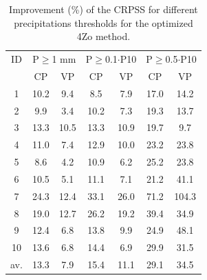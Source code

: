 \documentclass[review]{elsarticle}
\begin{document}
\begin{table}[t]
	\caption{Improvement (\%) of the CRPSS for different precipitations thresholds for the optimized 4Zo method.}
	\footnotesize
	\begin{center}
		\begin{tabular}{ccccccc}
			\hline 
			ID & \multicolumn{2}{c}{P\(\geq\)1 mm} & \multicolumn{2}{c}{P\(\geq\)0.1\(\cdot\)P10} & \multicolumn{2}{c}{P\(\geq\)0.5\(\cdot\)P10} \\ 
			& CP & VP & CP & VP & CP & VP \\ 
			\hline 
			1 & 10.2 & 9.4 & 8.5 & 7.9 & 17.0 & 14.2 \\ 
			2 & 9.9 & 3.4 & 10.2 & 7.3 & 19.3 & 13.7 \\ 
			3 & 13.3 & 10.5 & 13.3 & 10.9 & 19.7 & 9.7 \\ 
			4 & 11.0 & 7.4 & 12.9 & 10.0 & 23.2 & 23.8 \\ 
			5 & 8.6 & 4.2 & 10.9 & 6.2 & 25.2 & 23.8 \\ 
			6 & 10.5 & 5.1 & 11.1 & 7.1 & 21.2 & 41.1 \\ 
			7 & 24.3 & 12.4 & 33.1 & 26.0 & 71.2 & 104.3 \\ 
			8 & 19.0 & 12.7 & 26.2 & 19.2 & 39.4 & 34.9 \\ 
			9 & 12.4 & 6.8 & 13.8 & 9.9 & 24.9 & 48.1 \\ 
			10 & 13.6 & 6.8 & 14.4 & 6.9 & 29.9 & 31.5 \\ 
			\hline 
			av. & 13.3 & 7.9 & 15.4 & 11.1 & 29.1 & 34.5 \\ 
			\hline 
		\end{tabular} 
	\end{center}
	\label{table:scores_thresholds_4Zo}
\end{table}
\end{document}
